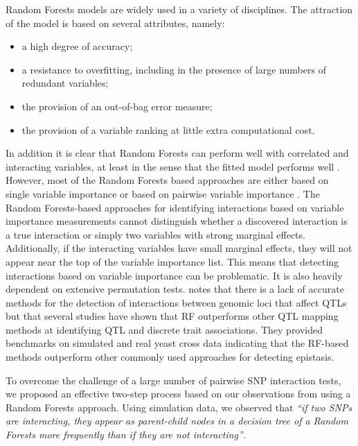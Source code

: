 \documentclass[preprint,12pt,3p]{elsarticle}
\begin{document}
Random Forests models are widely used \cite[]{lundbergConsistentIndividualizedFeature2019} in a variety of
disciplines. The attraction of the model is based on several attributes, namely:
\begin{itemize} 
\item a high degree of accuracy;
\item a resistance to overfitting, including in the presence of large numbers of redundant variables; 
\item the provision of an out-of-bag error measure; 
\item the provision of a variable ranking at little extra computational cost.
\end{itemize}
 
In addition it is clear that Random Forests can perform well with correlated and interacting variables, at least in the
sense that the fitted model performs well \cite[]{Ziegler.et.al.2007}. However, most of the Random Forests based
approaches are either based on single variable importance \cite[]{Jiang.et.al.2009, yoshidaSNPInterForestNewMethod2011}
or based on pairwise variable importance \cite[]{Ziegler.et.al.2007}. The Random Forests-based approaches for identifying
interactions based on variable importance measurements cannot distinguish whether a discovered interaction is a true
interaction or simply two variables with strong marginal effects. Additionally, if the interacting variables have small
marginal effects, they will not appear near the top of the variable importance list. This means that detecting
interactions based on variable importance can be problematic. It is also heavily dependent on extensive permutation
tests.  \cite{schmalohrDetectionEpistaticInteractions2018} notes that there is a lack of accurate methods for the
detection of interactions between genomic loci that affect QTLs but that several studies have shown that RF outperforms
other QTL mapping methods at identifying QTL and discrete trait associations. They provided benchmarks on simulated and
real yeast cross data indicating that the RF-based methods outperform other commonly used approaches for detecting
epistasis.

To overcome the challenge of a large number of pairwise SNP interaction tests, we proposed an effective two-step process
based on our observations from using a Random Forests approach. Using simulation data, we observed that \textit{``if two SNPs are
interacting, they appear as parent-child nodes in a decision tree of a Random Forests more frequently than if they are
not interacting''}.
\end{document}
